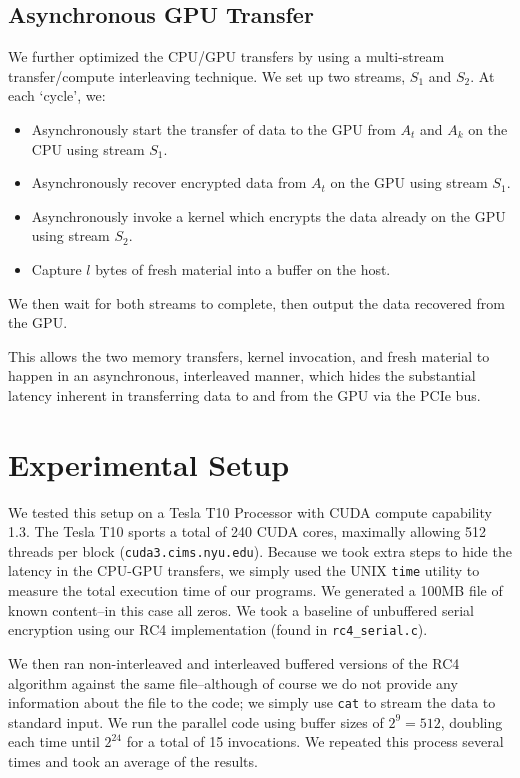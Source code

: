 \documentclass[twocolumn]{article}
\begin{document}
  \subsection{Asynchronous GPU Transfer}
  
  We further optimized the CPU/GPU transfers by using a multi-stream transfer/compute interleaving technique\cite{gpu-conf}. We set up two streams, $S_1$ and $S_2$. At each `cycle', we:
  
  \begin{itemize}
    \item Asynchronously start the transfer of data to the GPU from $A_t$ and $A_k$ on the CPU using stream $S_1$.
    \item Asynchronously recover encrypted data from $A_t$ on the GPU using stream $S_1$.
    \item Asynchronously invoke a kernel which encrypts the data already on the GPU using stream $S_2$.
    \item Capture $l$ bytes of fresh material into a buffer on the host.
  \end{itemize}
  
  We then wait for both streams to complete, then output the data recovered from the GPU.
  
  This allows the two memory transfers, kernel invocation, and fresh material to happen in an asynchronous, interleaved manner, which hides the substantial latency inherent in transferring data to and from the GPU via the PCIe bus.

  
  \section{Experimental Setup}
  
  We tested this setup on a Tesla T10 Processor with CUDA compute capability 1.3. The Tesla T10 sports a total of 240 CUDA cores, maximally allowing 512 threads per block (\texttt{cuda3.cims.nyu.edu}). Because we took extra steps to hide the latency in the CPU-GPU transfers, we simply used the UNIX \texttt{time} utility to measure the total execution time of our programs.
  We generated a 100MB file of known content--in this case all zeros. We took a baseline of unbuffered serial encryption using our RC4 implementation (found in \texttt{rc4\_serial.c}).
  
  We then ran non-interleaved and interleaved buffered versions of the RC4 algorithm against the same file--although of course we do not provide any information about the file to the code; we simply use \texttt{cat} to stream the data to standard input. We run the parallel code using buffer sizes of $2^9 = 512$, doubling each time until $2^24$ for a total of 15 invocations. We repeated this process several times and took an average of the results.
  
\end{document}
